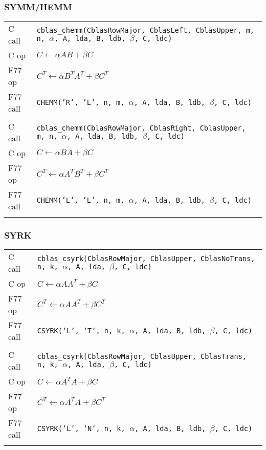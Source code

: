 \documentclass{article}
\begin{document}
\subsubsection{SYMM/HEMM}
{\small
\begin{tabular}{ll}
C call   & {\tt cblas\_chemm(CblasRowMajor, CblasLeft, CblasUpper, m, n, $\alpha$, A, lda, B, ldb, $\beta$, C, ldc)}\\
C op     & $C \leftarrow \alpha A B + \beta C$\\
F77 op   & $C^T \leftarrow \alpha B^T A^T + \beta C^T$\\
F77 call & {\tt CHEMM('R', 'L', n, m, $\alpha$, A, lda, B, ldb, $\beta$, C, ldc)}\\\\
%
C call   & {\tt cblas\_chemm(CblasRowMajor, CblasRight, CblasUpper, m, n, $\alpha$, A, lda, B, ldb, $\beta$, C, ldc)}\\
C op     & $C \leftarrow \alpha B A + \beta C$\\
F77 op   & $C^T \leftarrow \alpha A^T B^T + \beta C^T$\\
F77 call & {\tt CHEMM('L', 'L', n, m, $\alpha$, A, lda, B, ldb, $\beta$, C, ldc)}\\\\
\end{tabular}
}

\subsubsection{SYRK}
{\small
\begin{tabular}{ll}
C call   & {\tt cblas\_csyrk(CblasRowMajor, CblasUpper, CblasNoTrans, n, k, $\alpha$, A, lda, $\beta$, C, ldc)}\\
C op     & $C \leftarrow \alpha A A^T + \beta C$\\
F77 op   & $C^T \leftarrow \alpha A A^T + \beta C^T$\\
F77 call & {\tt CSYRK('L', 'T', n, k, $\alpha$, A, lda, B, ldb, $\beta$, C, ldc)}\\\\
%
C call   & {\tt cblas\_csyrk(CblasRowMajor, CblasUpper, CblasTrans, n, k, $\alpha$, A, lda, $\beta$, C, ldc)}\\
C op     & $C \leftarrow \alpha A^T A + \beta C$\\
F77 op   & $C^T \leftarrow \alpha A^T A + \beta C^T$\\
F77 call & {\tt CSYRK('L', 'N', n, k, $\alpha$, A, lda, B, ldb, $\beta$, C, ldc)}\\\\
\end{tabular}
}
\end{document}
